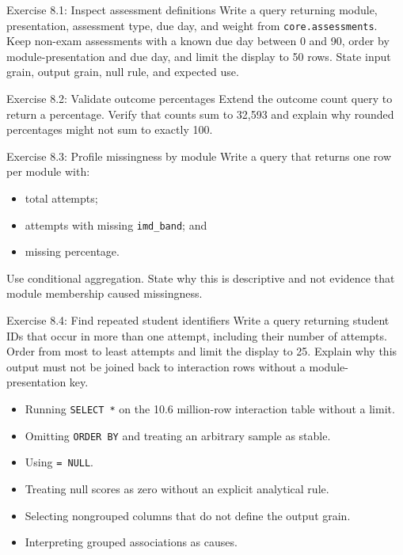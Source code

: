 \begin{exercisebox}{Exercise 8.1: Inspect assessment definitions}
Write a query returning module, presentation, assessment type, due day, and
weight from \texttt{core.assessments}. Keep non-exam assessments with a known
due day between 0 and 90, order by module-presentation and due day, and limit
the display to 50 rows. State input grain, output grain, null rule, and expected
use.
\end{exercisebox}

\begin{exercisebox}{Exercise 8.2: Validate outcome percentages}
Extend the outcome count query to return a percentage. Verify that counts sum
to 32,593 and explain why rounded percentages might not sum to exactly 100.
\end{exercisebox}

\begin{exercisebox}{Exercise 8.3: Profile missingness by module}
Write a query that returns one row per module with:
\begin{itemize}
  \item total attempts;
  \item attempts with missing \texttt{imd\_band}; and
  \item missing percentage.
\end{itemize}
Use conditional aggregation. State why this is descriptive and not evidence
that module membership caused missingness.
\end{exercisebox}

\begin{exercisebox}{Exercise 8.4: Find repeated student identifiers}
Write a query returning student IDs that occur in more than one attempt,
including their number of attempts. Order from most to least attempts and limit
the display to 25. Explain why this output must not be joined back to
interaction rows without a module-presentation key.
\end{exercisebox}

\begin{commonmistakes}
\begin{itemize}
  \item Running \texttt{SELECT *} on the 10.6 million-row interaction table
    without a limit.
  \item Omitting \texttt{ORDER BY} and treating an arbitrary sample as stable.
  \item Using \texttt{= NULL}.
  \item Treating null scores as zero without an explicit analytical rule.
  \item Selecting nongrouped columns that do not define the output grain.
  \item Interpreting grouped associations as causes.
\end{itemize}
\end{commonmistakes}

